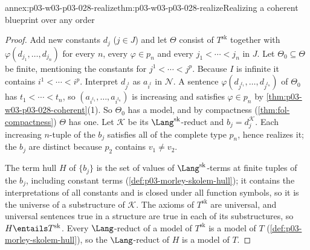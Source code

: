 \begin{annexitem}{annex:p03-w03-p03-028-realize}{thm:p03-w03-p03-028-realize}{Realizing a coherent blueprint over any order}
\begin{proof}
Add new constants \(d_j\) (\(j\in J\)) and let \(\Theta\) consist of
\(T^{\mathrm{sk}}\) together with \(\varphi(d_{j_1},\ldots,d_{j_n})\) for
every \(n\), every \(\varphi\in p_n\) and every \(j_1<\cdots<j_n\) in
\(J\).  Let \(\Theta_0\subseteq\Theta\) be finite, mentioning the constants
for \(j^1<\cdots<j^p\).  Because \(I\) is infinite it contains
\(i^1<\cdots<i^p\).  Interpret \(d_{j^t}\) as \(a_{i^t}\) in
\(\mathcal N\).  A sentence \(\varphi(d_{j^{t_1}},\ldots,d_{j^{t_n}})\) of
\(\Theta_0\) has \(t_1<\cdots<t_n\), so \((a_{i^{t_1}},\ldots,
a_{i^{t_n}})\) is increasing and satisfies \(\varphi\in p_n\) by
\cref{thm:p03-w03-p03-028-coherent}(1).  So \(\Theta_0\) has a model, and by
compactness (\cref{thm:fol-compactness}) \(\Theta\) has one.  Let
\(\mathcal K\) be its \(\Lang^{\mathrm{sk}}\)-reduct and
\(b_j=d_j^{\mathcal K}\).  Each increasing \(n\)-tuple of the \(b_j\)
satisfies all of the complete type \(p_n\), hence realizes it; the \(b_j\)
are distinct because \(p_2\) contains \(v_1\neq v_2\).

The term hull \(H\) of \(\{b_j\}\) is the set of values of
\(\Lang^{\mathrm{sk}}\)-terms at finite tuples of the \(b_j\), including
constant terms (\cref{def:p03-morley-skolem-hull}); it contains the
interpretations of all constants and is closed under all function symbols,
so it is the universe of a substructure of \(\mathcal K\).  The axioms of
\(T^{\mathrm{sk}}\) are universal, and universal sentences true in a
structure are true in each of its substructures, so \(H\entails
T^{\mathrm{sk}}\).  Every \(\Lang\)-reduct of a model of
\(T^{\mathrm{sk}}\) is a model of \(T\)
(\cref{def:p03-morley-skolem-hull}), so the \(\Lang\)-reduct of \(H\) is a
model of \(T\).
\end{proof}
\end{annexitem}

